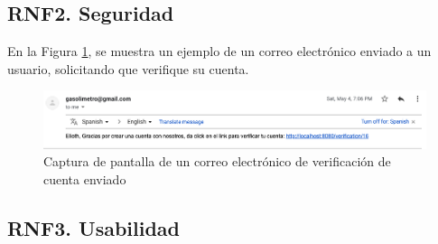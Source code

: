 \subsection{RNF2. Seguridad}

En la Figura \ref{fig:verificar}, se muestra un ejemplo de un correo electrónico enviado a un usuario, solicitando que verifique su cuenta.

\begin{figure}[H]
	\centering
	\includegraphics[scale=.45]{Capitulo6/no-funcionales/images/verificar}
	\caption{Captura de pantalla de un correo electrónico de verificación de cuenta enviado}
	\label{fig:verificar}
\end{figure}


\subsection{RNF3. Usabilidad}

